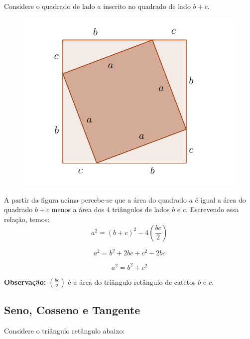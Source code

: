 Considere o quadrado de lado $ a $ inscrito no quadrado de lado $ b+c $.

\begin{figure}[H]
	\centering
	
	\includegraphics[scale=3.5]{imagens/pitagoras.png}

\end{figure}

A partir da figura acima percebe-se que a área do quadrado $a$ é igual a área do quadrado $b+c$ menos a área dos 4 triângulos de lados $b$ e $c$. Escrevendo essa relação, temos:
$$a^{2} = (b+c)^2 - 4\left(\dfrac{bc}{2}\right)$$

$$a^{2} = b^{2} + 2bc + c^{2} - 2bc$$

$$ a^{2} = b^{2}+c^{2}  $$

\textbf{Observação:}
$\left(\frac{bc}{2}\right)$ é a área do triângulo retângulo de catetos $b$ e $c$.

\subsection{Seno, Cosseno e Tangente}

Considere o triângulo retângulo abaixo:


